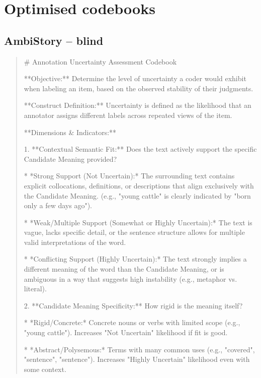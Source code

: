 \section{Optimised codebooks}
\label{app:codebooks}
\subsection*{AmbiStory -- blind}
\begin{quote}\small
# Annotation Uncertainty Assessment Codebook



**Objective:** Determine the level of uncertainty a coder would exhibit when labeling an item, based on the observed stability of their judgments.



**Construct Definition:** Uncertainty is defined as the likelihood that an annotator assigns different labels across repeated views of the item.



**Dimensions \& Indicators:**



1.  **Contextual Semantic Fit:** Does the text actively support the specific Candidate Meaning provided?

    *   *Strong Support (Not Uncertain):* The surrounding text contains explicit collocations, definitions, or descriptions that align exclusively with the Candidate Meaning. (e.g., "young cattle" is clearly indicated by "born only a few days ago").

    *   *Weak/Multiple Support (Somewhat or Highly Uncertain):* The text is vague, lacks specific detail, or the sentence structure allows for multiple valid interpretations of the word.

    *   *Conflicting Support (Highly Uncertain):* The text strongly implies a different meaning of the word than the Candidate Meaning, or is ambiguous in a way that suggests high instability (e.g., metaphor vs. literal).



2.  **Candidate Meaning Specificity:** How rigid is the meaning itself?

    *   *Rigid/Concrete:* Concrete nouns or verbs with limited scope (e.g., "young cattle"). Increases "Not Uncertain" likelihood if fit is good.

    *   *Abstract/Polysemous:* Terms with many common uses (e.g., "covered", "sentence", "sentence"). Increases "Highly Uncertain" likelihood even with some context.




\end{quote}
